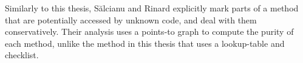 \documentclass[a4paper,12pt]{article}
\begin{document}
Similarly to this thesis, S\u{a}lcianu and Rinard explicitly mark parts of a method that are potentially accessed by unknown code, and deal with them conservatively. Their analysis uses a points-to graph to compute the purity of each method, unlike the method in this thesis that uses a lookup-table and checklist.





\end{document}
